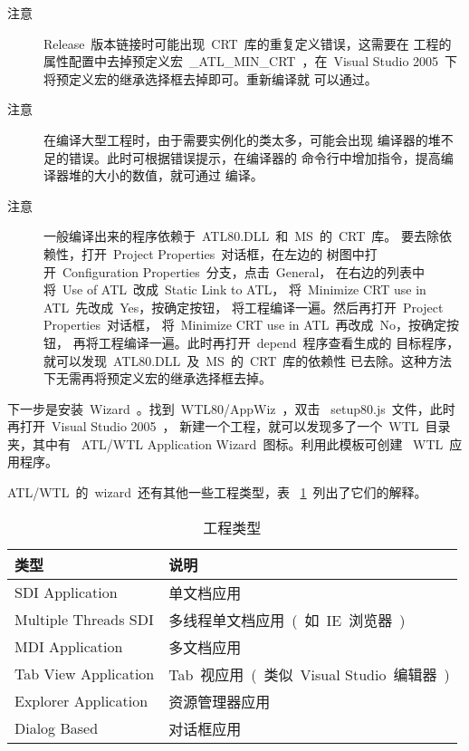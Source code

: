 \begin{description}
    \item [注意]
Release~版本链接时可能出现~CRT~库的重复定义错误，这需要在
工程的属性配置中去掉预定义宏~\_ATL\_MIN\_CRT~，在~Visual
Studio 2005~下将预定义宏的继承选择框去掉即可。重新编译就
可以通过。

    \item [注意]
在编译大型工程时，由于需要实例化的类太多，可能会出现
编译器的堆不足的错误。此时可根据错误提示，在编译器的
命令行中增加指令，提高编译器堆的大小的数值，就可通过
编译。

    \item [注意]
一般编译出来的程序依赖于~ATL80.DLL~和~MS~的~CRT~库。
要去除依赖性，打开~Project Properties~对话框，在左边的
树图中打开~Configuration Properties~分支，点击~General，
在右边的列表中将~Use of ATL~改成~Static Link to ATL，
将~Minimize CRT use in ATL~先改成~Yes，按确定按钮，
将工程编译一遍。然后再打开~Project Properties~对话框，
将~Minimize CRT use in ATL~再改成~No，按确定按钮，
再将工程编译一遍。此时再打开~depend~程序查看生成的
目标程序，就可以发现~ATL80.DLL~及~MS~的~CRT~库的依赖性
已去除。这种方法下无需再将预定义宏的继承选择框去掉。

\end{description}

下一步是安装~Wizard~。找到~WTL80/AppWiz~，双击
~setup80.js~文件，此时再打开~Visual Studio 2005~，
新建一个工程，就可以发现多了一个~WTL~目录夹，其中有
~ATL/WTL Application Wizard~图标。利用此模板可创建
~WTL~应用程序。

ATL/WTL~的~wizard~还有其他一些工程类型，表
~\ref{tab:setup:project}~列出了它们的解释。
\begin{table}[h]
  \centering
  \caption{工程类型}\label{tab:setup:project}
\begin{tabular}{|l|l|}
  \hline
  \textbf{类型} & \textbf{说明} \\
  \hline\hline
  SDI Application & 单文档应用 \\
  \hline
  Multiple Threads SDI
  & 多线程单文档应用~(~如~IE~浏览器~) \\
  \hline
  MDI Application & 多文档应用 \\
  \hline
  Tab View Application
  & Tab~视应用~(~类似~Visual Studio~编辑器~) \\
  \hline
  Explorer Application & 资源管理器应用 \\
  \hline
  Dialog Based & 对话框应用 \\
  \hline
\end{tabular}

\end{table}

